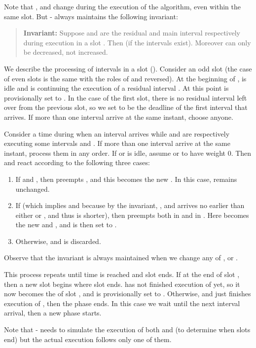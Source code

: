 \documentclass[11pt]{article}
\begin{document}
Note that ,  and  change during the execution of the
algorithm, even within the same slot. 
But - always maintains the following invariant:

\begin{quote}
{\bf Invariant:} 
Suppose  and  are the residual and main interval respectively
during execution in a slot .
Then  (if the intervals exist).
Moreover  can only be decreased, not increased.
\end{quote}

We describe the processing of intervals in a slot  ().
Consider an odd slot  (the case of even slots is the same with the
roles of  and  reversed).
At the beginning of ,  is idle and 
 is continuing the execution of a residual interval . 
At this point  is provisionally set to .
In the case of the first slot, there is no residual interval left over
from the previous slot, so we set  to be the deadline of the first
interval that arrives. If more than one interval arrive at the same instant,
choose anyone.
 
Consider a time during  when an interval  arrives while
 and  are respectively executing some intervals  and .
If more than one interval arrive at the same instant, process them in any
order.
If  or  is idle, assume  or  to have weight 0.
Then  and  react according to the following three cases:

\begin{enumerate}
\item
If  and ,
then  preempts , and this  becomes the new .
In this case,  remains unchanged.
\item
If  (which implies  and 
because by the invariant, , 
and  arrives no earlier than either  or , 
and thus  is shorter),
then  preempts both  in  and  in .
Here  becomes the new  and , and
 is then set to .  
\item
Otherwise,  and  is discarded.
\end{enumerate}

Observe that the invariant is always maintained when we change any of ,
 or .

This process repeats until time  is reached and slot  ends.
If  at the end of slot , then a new slot  begins 
where slot  ends.
 has not finished execution of  yet, so it
now becomes the  of slot , and
 is provisionally set to .
Otherwise,  and  just finishes execution of , 
then the phase ends. 
In this case we wait until the next interval 
arrival, then a new phase starts.

Note that - needs to simulate the execution of both  and 
(to determine when slots end) but the actual execution follows only one 
of them.
\end{document}
